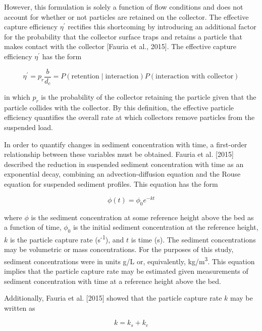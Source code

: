 \documentclass[12pt]{article}
\begin{document}
However, this formulation is solely a function of flow conditions and does not account for whether or not particles are retained on the collector. The effective capture efficiency $\eta^\prime$ rectifies this shortcoming by introducing an additional factor for the probability that the collector surface traps and retains a particle that makes contact with the collector [Fauria et al., 2015]. The effective capture efficiency $\eta^\prime$ has the form

\begin{equation} \label{effcapeff1}
    \eta^\prime=p_r \frac{b}{d_c}=P(\text{retention} \mid \text{interaction}) P(\text{interaction with collector})
\end{equation}

\noindent in which $p_r$ is the probability of the collector retaining the particle given that the particle collides with the collector. By this definition, the effective particle efficiency quantifies the overall rate at which collectors remove particles from the suspended load.

In order to quantify changes in sediment concentration with time, a first-order relationship between these variables must be obtained. Fauria et al. [2015] described the reduction in suspended sediment concentration with time as an exponential decay, combining an advection-diffusion equation and the Rouse equation for suspended sediment profiles. This equation has the form

\begin{equation} \label{expmod}
    \phi(t)=\phi_0 e^{-kt}
\end{equation}

\noindent where $\phi$ is the sediment concentration at some reference height above the bed as a function of time, $\phi_0$ is the initial sediment concentration at the reference height, $k$ is the particle capture rate (s\textsuperscript{-1}), and $t$ is time (s). The sediment concentrations may be volumetric or mass concentrations. For the purposes of this study, sediment concentrations were in units g/L or, equivalently, kg/m\textsuperscript{3}. This equation implies that the particle capture rate may be estimated given measurements of sediment concentration with time at a reference height above the bed.

Additionally, Fauria et al. [2015] showed that the particle capture rate $k$ may be written as

\begin{equation} \label{addk}
    k=k_s+k_c
\end{equation}
\end{document}
